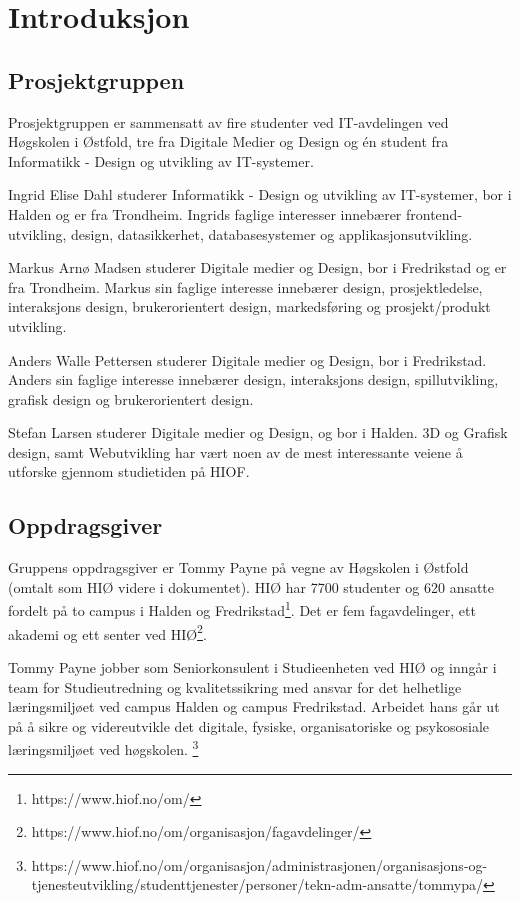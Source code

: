 \cleardoublepage
\chapter{Introduksjon}
\label{chap:intro}

\section{Prosjektgruppen}
Prosjektgruppen er sammensatt av fire studenter ved IT-avdelingen ved Høgskolen i Østfold, tre fra Digitale Medier og Design og én student fra Informatikk - Design og utvikling av IT-systemer.

Ingrid Elise Dahl studerer Informatikk - Design og utvikling av IT-systemer, bor i Halden og er fra Trondheim. Ingrids faglige interesser innebærer frontend-utvikling, design, datasikkerhet, databasesystemer og applikasjonsutvikling.

Markus Arnø Madsen studerer Digitale medier og Design, bor i Fredrikstad og er fra Trondheim. Markus sin faglige interesse innebærer design, prosjektledelse, interaksjons design, brukerorientert design, markedsføring og prosjekt/produkt utvikling.

Anders Walle Pettersen studerer Digitale medier og Design, bor i Fredrikstad. Anders sin faglige interesse innebærer design, interaksjons design, spillutvikling, grafisk design og brukerorientert design.

Stefan Larsen studerer Digitale medier og Design, og bor i Halden. 3D og Grafisk design, samt Webutvikling har vært noen av de mest interessante veiene å utforske gjennom studietiden på HIOF. 


\section{Oppdragsgiver}
Gruppens oppdragsgiver er Tommy Payne på vegne av Høgskolen i Østfold (omtalt som HIØ videre i dokumentet). HIØ har 7700 studenter og 620 ansatte fordelt på to campus i Halden og Fredrikstad\footnote{https://www.hiof.no/om/}. Det er fem fagavdelinger, ett akademi og ett senter ved HIØ\footnote{https://www.hiof.no/om/organisasjon/fagavdelinger/}.

Tommy Payne jobber som Seniorkonsulent i Studieenheten ved HIØ og inngår i team for Studieutredning og kvalitetssikring med ansvar for det helhetlige læringsmiljøet ved campus Halden og campus Fredrikstad. Arbeidet hans går ut på å sikre og videreutvikle det digitale, fysiske, organisatoriske og psykososiale læringsmiljøet ved høgskolen. \footnote{https://www.hiof.no/om/organisasjon/administrasjonen/organisasjons-og-tjenesteutvikling/studenttjenester/personer/tekn-adm-ansatte/tommypa/}

